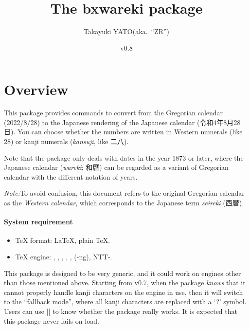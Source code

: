 \documentclass[a4paper]{article}
\newcommand{\PkgVersion}{0.8}
\newcommand{\PkgDate}{2026/06/06}
\newcommand{\Pkg}[1]{\textsf{#1}}
\newcommand{\Note}{\par\noindent\emph{Note:}\quad}
\newcommand*{\Ja}[1]{{\fIpaex#1}}
\newcommand*{\+}{\hspace{0.25em minus 0.25em}}
\begin{document}
\title{The \Pkg{bxwareki} package}
\author{Takayuki YATO\quad (aka.~``ZR'')}
\date{v\PkgVersion \quad[\PkgDate]}
\maketitle

\section{Overview}
\label{sec:Overview}

This package provides commands to convert from the Gregorian calendar
(2022/8/28) to the Japanese rendering of the Japanese calendar
(\Ja{令和\+4\+年\+8\+月\+28\+日}).
You can choose whether the numbers are written
in Western numerals (like 28)
or kanji numerals (\emph{kansuji}, like \Ja{二八}).

Note that the package only deals with dates in the year 1873 or later,
where the Japanese calendar (\emph{wareki}; \Ja{和暦})
can be regarded as a variant of Gregorian calendar
with the different notation of years.

\Note To avoid confusion, this document refers to the original Gregorian
calendar as the \emph{Western calendar},
which corresponds to the Japanese term \emph{seireki} (\Ja{西暦}).

\paragraph{System requirement}

\begin{itemize}
\item \TeX{} format: \LaTeX, plain {\TeX}.
\item \TeX{} engine: {\pdfTeX}, {\LuaTeX}, {\XeTeX},
  {\pTeX}, {\upTeX}, {\ApTeX} ({\pTeX}-ng), NTT-{\JTeX}.
\end{itemize}

This package is designed to be very generic,
and it could work on engines other than those mentioned above.
Starting from v0.7,
when the package \emph{knows} that it cannot properly handle
kanji characters on the engine in use,
then it will switch to the ``fallback mode'',
where all kanji characters are replaced with a `?' symbol.
Users can use |\WarekiIfAvailable| to know
whether the package really works.
It is expected
that this package never fails on load.

\end{document}
